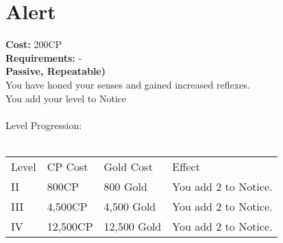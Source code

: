 \section{Alert}\label{perk:alert}
\textbf{Cost:} 200CP\\
\textbf{Requirements:} -\\
\textbf{Passive, Repeatable)}\\
You have honed your senses and gained increased reflexes.\\
You add your level to Notice\\
\\
Level Progression:\\
\\
\begin{tabular}{l | l | l | l}
	Level & CP Cost & Gold Cost & Effect\\
	II & 800CP & 800 Gold & You add 2 to Notice.\\
	III & 4,500CP & 4,500 Gold & You add 2 to Notice.\\
	IV & 12,500CP & 12,500 Gold & You add 2 to Notice.\\
\end{tabular}
